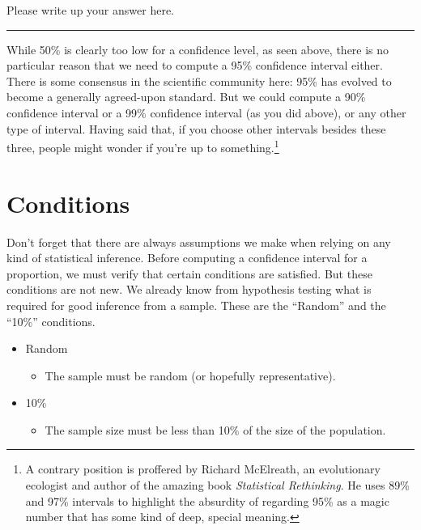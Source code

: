\documentclass[
]{book}
\providecommand{\tightlist}{%
  \setlength{\itemsep}{0pt}\setlength{\parskip}{0pt}}
\begin{document}
Please write up your answer here.

\begin{center}\rule{0.5\linewidth}{0.5pt}\end{center}

While 50\% is clearly too low for a confidence level, as seen above, there is no particular reason that we need to compute a 95\% confidence interval either. There is some consensus in the scientific community here: 95\% has evolved to become a generally agreed-upon standard. But we could compute a 90\% confidence interval or a 99\% confidence interval (as you did above), or any other type of interval. Having said that, if you choose other intervals besides these three, people might wonder if you're up to something.\footnote{A contrary position is proffered by Richard McElreath, an evolutionary ecologist and author of the amazing book \emph{Statistical Rethinking}. He uses 89\% and 97\% intervals to highlight the absurdity of regarding 95\% as a magic number that has some kind of deep, special meaning.}

\hypertarget{ci-conditions}{%
\section{Conditions}\label{ci-conditions}}

Don't forget that there are always assumptions we make when relying on any kind of statistical inference. Before computing a confidence interval for a proportion, we must verify that certain conditions are satisfied. But these conditions are not new. We already know from hypothesis testing what is required for good inference from a sample. These are the ``Random'' and the ``10\%'' conditions.

\begin{itemize}
\tightlist
\item
  Random

  \begin{itemize}
  \tightlist
  \item
    The sample must be random (or hopefully representative).
  \end{itemize}
\item
  10\%

  \begin{itemize}
  \tightlist
  \item
    The sample size must be less than 10\% of the size of the population.
  \end{itemize}
\end{itemize}
\end{document}
